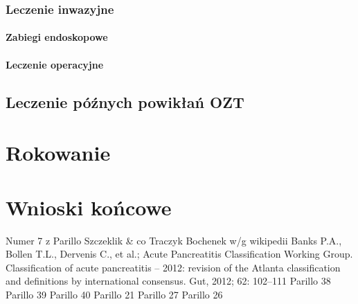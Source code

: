 \documentclass[a4paper, 12pt]{report}
\begin{document}
\subsection{Leczenie inwazyjne}
\subsubsection{Zabiegi endoskopowe}
\subsubsection{Leczenie operacyjne}

\section{Leczenie późnych powikłań OZT}

\chapter{Rokowanie}

\chapter{Wnioski końcowe}

\begin{thebibliography}{99}
 Numer 7 z Parillo
 Szczeklik \& co
 Traczyk
 Bochenek w/g wikipedii
 Banks P.A., Bollen T.L., Dervenis C., et al.; Acute
  Pancreatitis Classification Working Group. Classification of acute
  pancreatitis – 2012: revision of the Atlanta classification and
  definitions by international consensus. Gut, 2012; 62: 102–111
 Parillo 38
 Parillo 39
 Parillo 40
 Parillo 21
 Parillo 27
 Parillo 26
\end{thebibliography}
\end{document}
